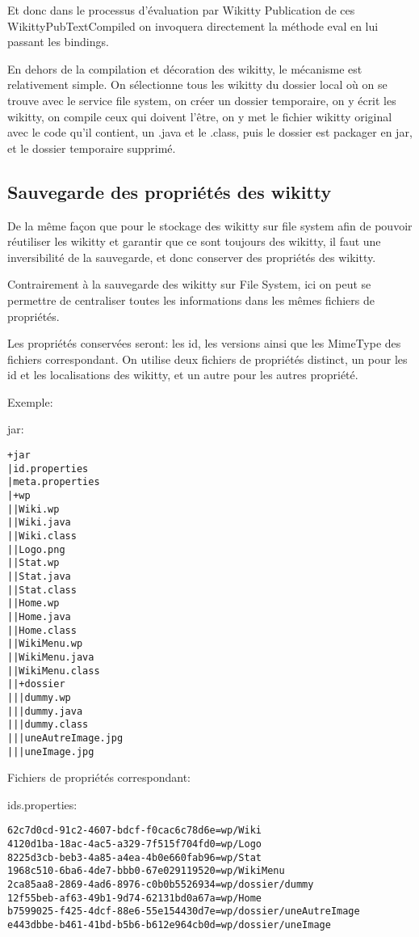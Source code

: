 Et donc dans le processus d'évaluation par Wikitty Publication de ces 
WikittyPubTextCompiled on invoquera directement la méthode eval en lui passant
les bindings.

En dehors de la compilation et décoration des wikitty, le mécanisme est 
relativement simple. On sélectionne tous les wikitty du dossier local où on
se trouve avec le service file system, on créer un dossier temporaire, 
on y écrit les wikitty, on compile ceux qui doivent l'être, on y met le fichier
wikitty original avec le code qu'il contient, un .java et le .class, puis le 
dossier est packager en jar, et le dossier temporaire supprimé.


\subsection{Sauvegarde des propriétés des wikitty}

De la même façon que pour le stockage des wikitty sur file system afin de 
pouvoir réutiliser les wikitty et garantir que ce sont toujours des wikitty,
il faut une inversibilité de la sauvegarde, et donc conserver des propriétés des
wikitty.

Contrairement à la sauvegarde des wikitty sur File System, ici on peut se 
permettre de centraliser toutes les informations dans les mêmes fichiers de 
propriétés. 

Les propriétés conservées seront: les id, les versions ainsi que les MimeType
des fichiers correspondant. On utilise deux fichiers de propriétés distinct, 
un pour les id et les localisations des wikitty, et un autre pour les autres 
propriété.

Exemple: %

jar:
\begin{verbatim}
+jar
|id.properties
|meta.properties
|+wp
||Wiki.wp
||Wiki.java
||Wiki.class
||Logo.png
||Stat.wp
||Stat.java
||Stat.class
||Home.wp
||Home.java
||Home.class
||WikiMenu.wp
||WikiMenu.java
||WikiMenu.class
||+dossier
|||dummy.wp
|||dummy.java
|||dummy.class
|||uneAutreImage.jpg
|||uneImage.jpg
\end{verbatim}

Fichiers de propriétés correspondant:


ids.properties:
\begin{verbatim}
62c7d0cd-91c2-4607-bdcf-f0cac6c78d6e=wp/Wiki
4120d1ba-18ac-4ac5-a329-7f515f704fd0=wp/Logo
8225d3cb-beb3-4a85-a4ea-4b0e660fab96=wp/Stat
1968c510-6ba6-4de7-bbb0-67e029119520=wp/WikiMenu
2ca85aa8-2869-4ad6-8976-c0b0b5526934=wp/dossier/dummy
12f55beb-af63-49b1-9d74-62131bd0a67a=wp/Home
b7599025-f425-4dcf-88e6-55e154430d7e=wp/dossier/uneAutreImage
e443dbbe-b461-41bd-b5b6-b612e964cb0d=wp/dossier/uneImage
\end{verbatim}


